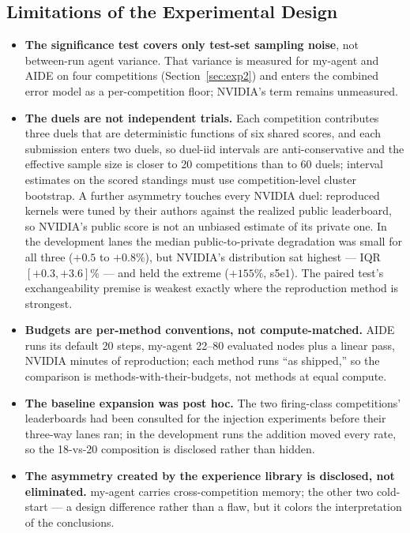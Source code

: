 \documentclass[11pt,a4paper]{article}
\begin{document}
\subsection{Limitations of the Experimental Design}
\label{sec:limitations}

\begin{itemize}[leftmargin=*]
  \item \textbf{The significance test covers only test-set sampling noise}, not between-run agent variance. That variance is measured for my-agent and AIDE on four competitions (Section~\ref{sec:exp2}) and enters the combined error model as a per-competition floor; NVIDIA's term remains unmeasured.
  \item \textbf{The duels are not independent trials.} Each competition contributes three
  duels that are deterministic functions of six shared scores, and each submission enters two
  duels, so duel-iid intervals are anti-conservative and the effective sample size is closer to 20
  competitions than to 60 duels; interval estimates on the scored standings must use
  competition-level cluster bootstrap. A further asymmetry touches every NVIDIA duel:
  reproduced kernels were tuned by their authors against the realized public leaderboard, so
  NVIDIA's public score is not an unbiased estimate of its private one. In the development lanes the median public-to-private degradation was small for all three ($+0.5$ to
  $+0.8\%$), but NVIDIA's distribution sat highest --- IQR $[+0.3, +3.6]\%$ --- and held the
  extreme ($+155\%$, s5e1). The paired test's exchangeability premise is weakest exactly where
  the reproduction method is strongest.
  \item \textbf{Budgets are per-method conventions, not compute-matched.} AIDE runs its
  default 20 steps, my-agent 22--80 evaluated nodes plus a linear pass, NVIDIA minutes of
  reproduction; each method runs ``as shipped,'' so the comparison is methods-with-their-budgets,
  not methods at equal compute.
  \item \textbf{The baseline expansion was post hoc.} The two firing-class competitions'
  leaderboards had been consulted for the injection experiments before their three-way lanes
  ran; in the development runs the addition moved every rate, so the 18-vs-20 composition is
  disclosed rather than hidden.
  \item \textbf{The asymmetry created by the experience library is disclosed, not eliminated.} my-agent carries cross-competition memory; the other two cold-start --- a design difference rather than a flaw, but it colors the interpretation of the conclusions.

\end{itemize}
\end{document}
